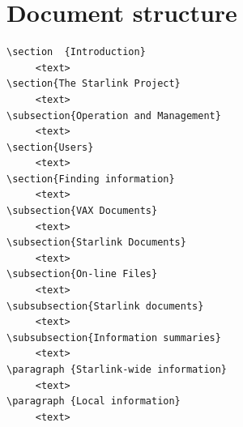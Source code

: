 \documentclass[twoside,11pt]{article}
\newcommand{\xlabel}[1]{}
\renewcommand{\_}{\texttt{\symbol{95}}}
\begin{document}
\newpage

\section {Document structure\xlabel{document_structure}}

\begin{verbatim}
\section  {Introduction}
     <text>
\section{The Starlink Project}
     <text>
\subsection{Operation and Management}
     <text>
\section{Users}
     <text>
\section{Finding information}
     <text>
\subsection{VAX Documents}
     <text>
\subsection{Starlink Documents}
     <text>
\subsection{On-line Files}
     <text>
\subsubsection{Starlink documents}
     <text>
\subsubsection{Information summaries}
     <text>
\paragraph {Starlink-wide information}
     <text>
\paragraph {Local information}
     <text>

\end{verbatim}
\end{document}
